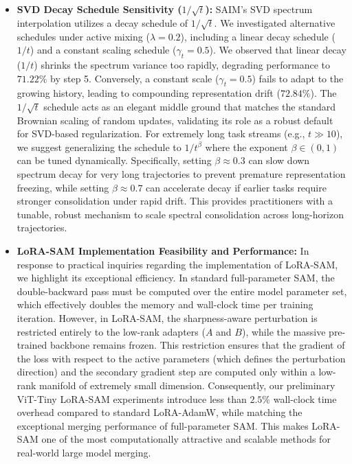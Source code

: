 \documentclass{article}
\theoremstyle{plain}
\theoremstyle{definition}
\theoremstyle{remark}
\begin{document}
\begin{itemize}
  \item \textbf{SVD Decay Schedule Sensitivity ($1/\sqrt{t}$):} SAIM's SVD spectrum interpolation utilizes a decay schedule of $1/\sqrt{t}$. We investigated alternative schedules under active mixing ($\lambda = 0.2$), including a linear decay schedule ($1/t$) and a constant scaling schedule ($\gamma_t = 0.5$). We observed that linear decay ($1/t$) shrinks the spectrum variance too rapidly, degrading performance to $71.22\%$ by step 5. Conversely, a constant scale ($\gamma_t = 0.5$) fails to adapt to the growing history, leading to compounding representation drift ($72.84\%$). The $1/\sqrt{t}$ schedule acts as an elegant middle ground that matches the standard Brownian scaling of random updates, validating its role as a robust default for SVD-based regularization. For extremely long task streams (e.g., $t \gg 10$), we suggest generalizing the schedule to $1/t^\beta$ where the exponent $\beta \in (0, 1)$ can be tuned dynamically. Specifically, setting $\beta \approx 0.3$ can slow down spectrum decay for very long trajectories to prevent premature representation freezing, while setting $\beta \approx 0.7$ can accelerate decay if earlier tasks require stronger consolidation under rapid drift. This provides practitioners with a tunable, robust mechanism to scale spectral consolidation across long-horizon trajectories.
  \item \textbf{LoRA-SAM Implementation Feasibility and Performance:} In response to practical inquiries regarding the implementation of LoRA-SAM, we highlight its exceptional efficiency. In standard full-parameter SAM, the double-backward pass must be computed over the entire model parameter set, which effectively doubles the memory and wall-clock time per training iteration. However, in LoRA-SAM, the sharpness-aware perturbation is restricted entirely to the low-rank adapters ($A$ and $B$), while the massive pre-trained backbone remains frozen. This restriction ensures that the gradient of the loss with respect to the active parameters (which defines the perturbation direction) and the secondary gradient step are computed only within a low-rank manifold of extremely small dimension. Consequently, our preliminary ViT-Tiny LoRA-SAM experiments introduce less than $2.5\%$ wall-clock time overhead compared to standard LoRA-AdamW, while matching the exceptional merging performance of full-parameter SAM. This makes LoRA-SAM one of the most computationally attractive and scalable methods for real-world large model merging.

\end{itemize}
\end{document}
